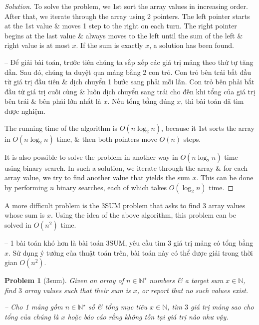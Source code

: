 \documentclass{article}
\newtheorem{problem}{Problem}
\begin{document}
\begin{center}
\end{center}

\begin{proof}[Solution]
    To solve the problem, we 1st sort the array values in increasing order. After that, we iterate through the array using 2 pointers. The left pointer starts at the 1st value \& moves 1 step to the right on each turn. The right pointer begins at the last value \& always moves to the left until the sum of the left \& right value is at most $x$. If the sum is exactly $x$, a solution has been found.

    -- Để giải bài toán, trước tiên chúng ta sắp xếp các giá trị mảng theo thứ tự tăng dần. Sau đó, chúng ta duyệt qua mảng bằng 2 con trỏ. Con trỏ bên trái bắt đầu từ giá trị đầu tiên \& dịch chuyển 1 bước sang phải mỗi lần. Con trỏ bên phải bắt đầu từ giá trị cuối cùng \& luôn dịch chuyển sang trái cho đến khi tổng của giá trị bên trái \& bên phải lớn nhất là $x$. Nếu tổng bằng đúng $x$, thì bài toán đã tìm được nghiệm.

    The running time of the algorithm is $O(n\log_2n)$, because it 1st sorts the array in $O(n\log_2n)$ time, \& then both pointers move $O(n)$ steps.

    It is also possible to solve the problem in another way in $O(n\log_2n)$ time using binary search. In such a solution, we iterate through the array \& for each array value, we try to find another value that yields the sum $x$. This can be done by performing $n$ binary searches, each of which takes $O(\log_2n)$ time.
\end{proof}

A more difficult problem is the 3SUM problem that asks to find 3 array values whose sum is $x$. Using the idea of the above algorithm, this problem can be solved in $O(n^2)$ time.

-- 1 bài toán khó hơn là bài toán 3SUM, yêu cầu tìm 3 giá trị mảng có tổng bằng $x$. Sử dụng ý tưởng của thuật toán trên, bài toán này có thể được giải trong thời gian $O(n^2)$.

\begin{problem}[3sum]
    Given an array of $n\in\mathbb{N}^\star$ numbers \& a target sum $x\in\mathbb{N}$, find $3$ array values such that their sum is $x$, or report that no such values exist.

    -- Cho 1 mảng gồm $n\in\mathbb{N}^\star$ số \& tổng mục tiêu $x\in\mathbb{N}$, tìm $3$ giá trị mảng sao cho tổng của chúng là $x$ hoặc báo cáo rằng không tồn tại giá trị nào như vậy.
\end{problem}
\end{document}
